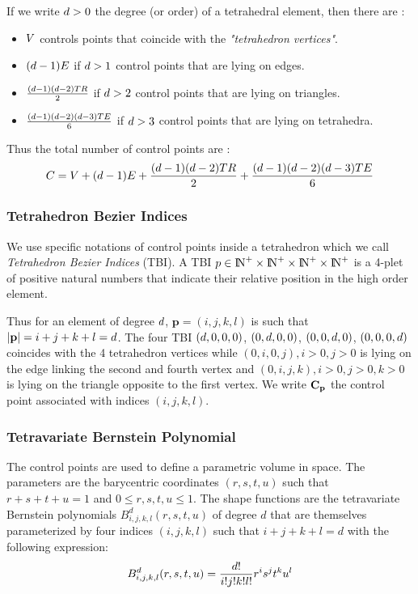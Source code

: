 \documentclass[a4paper,11pt]{article}
\begin{document}
If we write ${d}>0$ the degree (or order) of a tetrahedral element, then there are :

\begin{itemize}
	\item ${ V}$ controls points that coincide with the {\em "tetrahedron vertices"}.
	\item $({d}-1) { E}$ if ${d}>1$ control points that are lying on edges. 
	\item $\frac{({d}-1) ({d}-2) { TR}}{2}$ if ${d}>2$ control points that are lying on triangles. 
	\item $\frac{({d}-1) ({d}-2) ({d}-3) { TE}}{6}$ if ${d}>3$ control points that are lying on tetrahedra. 
\end{itemize}

Thus the total number of control points are :
\[
{C}={ V}+({d}-1) { E}+\frac{({d}-1) ({d}-2) { TR}}{2}+\frac{({d}-1) ({d}-2) ({d}-3) { TE}}{6}
\]
\subsubsection{Tetrahedron Bezier Indices}

We use specific notations of control points inside a tetrahedron which we call {\em Tetrahedron Bezier Indices} (TBI).
A TBI $p\in {\rm I\!N}^{+}\times{\rm I\!N}^{+}\times{\rm I\!N}^{+}\times{\rm I\!N}^{+}$ is a 4-plet of positive natural numbers that indicate their relative position in the high order element. 

Thus for an element of degree ${d}$, ${\mathbf p}=(i,j,k,l)$ is such that $|{\mathbf p}|=i+j+k+l={d}$.  The four TBI $({d},0,0,0)$, $(0,{d},0,0)$, $(0,0,{d},0)$, $(0,0,0,{d})$ coincides with the 4 tetrahedron vertices while $(0,i,0,j), i>0, j>0$ is lying on the edge linking the second and fourth vertex and   $(0,i,j,k), i>0, j>0, k>0$ is lying on the triangle opposite to the first vertex. We write ${\mathbf C}_{\mathbf p}$ the control point associated with indices $(i,j,k,l)$.

\subsubsection{Tetravariate Bernstein Polynomial}

The control points are used to define a parametric volume in space. The parameters are the barycentric coordinates $(r,s,t,u)$ such that $r+s+t+u=1$ and $0\leq r,s,t,u \leq 1$. The shape functions are the tetravariate Bernstein polynomials $B^d_{i,j,k,l}(r,s,t,u)$ of degree $d$ that are themselves parameterized by four indices $(i,j,k,l)$ such that $i+j+k+l=d$ with the following expression:
\[
B^{d}_{i,j,k,l}(r,s,t,u)=\frac{{d}!}{i! j! k! l!} r^i s^j t^k u ^l
\]
\end{document}
